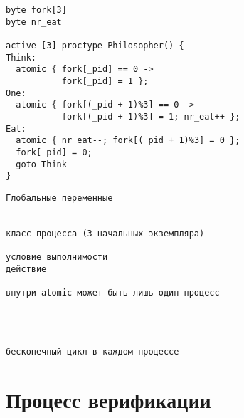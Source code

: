\documentclass[12pt]{article}
\begin{document}
\begin{minipage}[t]{.53\textwidth}
\scriptsize
\begin{verbatim}
byte fork[3]
byte nr_eat

active [3] proctype Philosopher() { 
Think:
  atomic { fork[_pid] == 0 -> 
           fork[_pid] = 1 };
One:
  atomic { fork[(_pid + 1)%3] == 0 -> 
           fork[(_pid + 1)%3] = 1; nr_eat++ };
Eat:
  atomic { nr_eat--; fork[(_pid + 1)%3] = 0 };
  fork[_pid] = 0;
  goto Think
}
\end{verbatim}
\normalsize
\end{minipage}
%
\begin{minipage}[t]{.47\textwidth}
\scriptsize
\begin{verbatim}
Глобальные переменные


класс процесса (3 начальных экземпляра)

условие выполнимости
действие

внутри atomic может быть лишь один процесс




бесконечный цикл в каждом процессе

\end{verbatim}
\normalsize
\end{minipage}






\section{Процесс верификации}
\label{sec:idef0}
\end{document}

